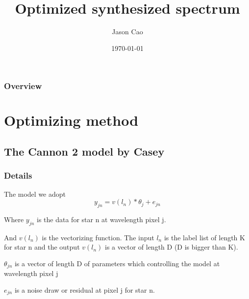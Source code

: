 \documentclass{beamer}
\title[]{Optimized synthesized spectrum} %
\author{Jason Cao} %
\institute[NYU] %
{
New York University \\ %
\medskip
\textit{jc6933@nyu.edu} %
}
\date{\today} %
\begin{document}
\begin{frame}
\titlepage %
\end{frame}

\begin{frame}
\frametitle{Overview} %
\tableofcontents %
\end{frame}


\section{Optimizing method} %

\subsection{The Cannon 2 model by Casey} %

\begin{frame}
\frametitle{Details}

The model we adopt
 \[y_{jn} = v(l_n) * \theta_{j} + e_{jn} \]
 
 Where \(y_{jn}\) is the data for star n at wavelength pixel j. 
 
And \(v(l_n)\) is the vectorizing function. 
The input \(l_n\) is the label list of length K for star n and the  output 
\(v(l_n)\) is a vector of length D (D is bigger than K).

\( \theta_{jn}\) is a vector of length D of parameters which controlling the model at wavelength pixel j

\( e_{jn}\) is a noise draw or residual at pixel j for star n.
 

\end{frame}
\end{document}
